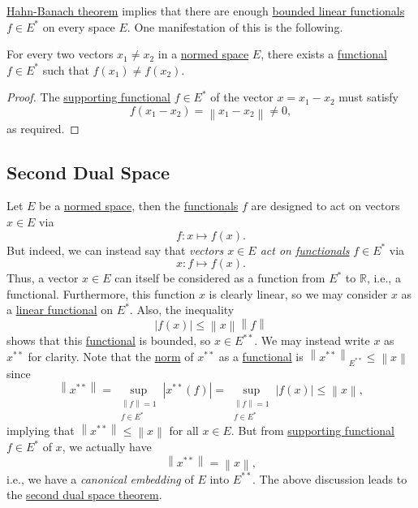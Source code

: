 \hyperref[thm:Hahn-Banach]{Hahn-Banach theorem} implies that there are enough \hyperref[def:bounded-linear-functional]{bounded linear functionals} \(f\in E^{\ast} \) on every space \(E\). One manifestation of this is the following.
\begin{corollary}
	For every two vectors \(x_1 \neq x_2\) in a \hyperref[def:normed-vector-space]{normed space} \(E\), there exists a \hyperref[def:linear-functional]{functional} \(f\in E^{\ast} \) such that \(f(x_1) \neq f(x_2)\).
\end{corollary}
\begin{proof}
	The \hyperref[thm:supporting-functional]{supporting functional} \(f\in E^{\ast} \) of the vector \(x = x_1 - x_2\) must satisfy
	\[
		f(x_1 - x_2)= \left\lVert x_1 - x_2\right\rVert \neq 0,
	\]
	as required.
\end{proof}

\subsection{Second Dual Space}
Let \(E\) be a \hyperref[def:normed-vector-space]{normed space}, then the \hyperref[def:linear-functional]{functionals} \(f \) are designed to act on vectors \(x\in E\) via
\[
	f\colon x \mapsto f(x).
\]
But indeed, we can instead say that \emph{vectors \(x\in E\) act on \hyperref[def:linear-functional]{functionals}} \(f\in E^{\ast} \) via
\[
	x\colon f\mapsto f(x).
\]
Thus, a vector \(x\in E\) can itself be considered as a function from \(E^{\ast} \) to \(\mathbb{R} \), i.e., a functional. Furthermore, this function \(x\) is clearly linear, so we may consider \(x\) as a \hyperref[def:linear-functional]{linear functional} on \(E^{\ast} \). Also, the inequality
\[
	\left\vert f(x) \right\vert \leq \left\lVert x\right\rVert \left\lVert f\right\rVert
\]
shows that this \hyperref[def:linear-functional]{functional} is bounded, so \(x\in E^{\ast\ast} \). We may instead write \(x\) as \(x^{\ast\ast} \) for clarity. Note that the \hyperref[def:norm]{norm} of \(x^{\ast\ast} \) as a \hyperref[def:linear-functional]{functional} is \(\left\lVert x^{\ast\ast} \right\rVert _{E^{\ast\ast} } \leq \left\lVert x\right\rVert \) since
\[
	\left\lVert x^{\ast\ast} \right\rVert = \sup _{\substack{\left\lVert f\right\rVert = 1\\ f\in E^{\ast} }}\left\vert x^{\ast\ast} (f) \right\vert = \sup _{\substack{\left\lVert f\right\rVert = 1\\ f\in E^{\ast}}} \left\vert f(x) \right\vert  \leq \left\lVert x\right\rVert,
\]
implying that \(\left\lVert x^{\ast\ast} \right\rVert \leq \left\lVert x\right\rVert \) for all \(x\in E\). But from \hyperref[thm:supporting-functional]{supporting functional} \(f\in E^{\ast} \) of \(x\), we actually have
\[
	\left\lVert x^{\ast\ast} \right\rVert = \left\lVert x\right\rVert,
\]
i.e., we have a \emph{canonical embedding} of \(E\) into \(E^{\ast\ast}\). The above discussion leads to the \hyperref[thm:second-dual-space]{second dual space theorem}.

